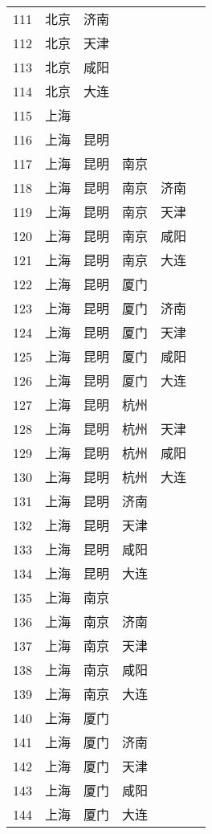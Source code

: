 \begin{footnotesize}
\begin{longtable}{cccccc}
        111	& 北京  & 济南 \\
        112	& 北京  & 天津 \\
        113	& 北京  & 咸阳 \\
        114	& 北京  & 大连 \\
        115	& 上海 \\
        116	& 上海  & 昆明 \\
        117	& 上海  & 昆明  & 南京 \\
        118	& 上海  & 昆明  & 南京  & 济南 \\
        119	& 上海  & 昆明  & 南京  & 天津 \\
        120	& 上海  & 昆明  & 南京  & 咸阳 \\
        121	& 上海  & 昆明  & 南京  & 大连 \\
        122	& 上海  & 昆明  & 厦门 \\
        123	& 上海  & 昆明  & 厦门  & 济南 \\
        124	& 上海  & 昆明  & 厦门  & 天津 \\
        125	& 上海  & 昆明  & 厦门  & 咸阳 \\
        126	& 上海  & 昆明  & 厦门  & 大连 \\
        127	& 上海  & 昆明  & 杭州 \\
        128	& 上海  & 昆明  & 杭州  & 天津 \\
        129	& 上海  & 昆明  & 杭州  & 咸阳 \\
        130	& 上海  & 昆明  & 杭州  & 大连 \\
        131	& 上海  & 昆明  & 济南 \\
        132	& 上海  & 昆明  & 天津 \\
        133	& 上海  & 昆明  & 咸阳 \\
        134	& 上海  & 昆明  & 大连 \\
        135	& 上海  & 南京 \\
        136	& 上海  & 南京  & 济南 \\
        137	& 上海  & 南京  & 天津 \\
        138	& 上海  & 南京  & 咸阳 \\
        139	& 上海  & 南京  & 大连 \\
        140	& 上海  & 厦门 \\
        141	& 上海  & 厦门  & 济南 \\
        142	& 上海  & 厦门  & 天津 \\
        143	& 上海  & 厦门  & 咸阳 \\
        144	& 上海  & 厦门  & 大连 \\

\end{longtable}
\end{footnotesize}
